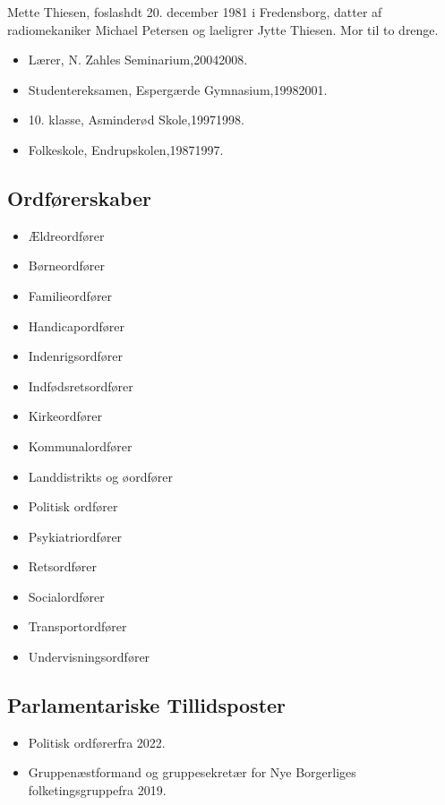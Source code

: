 \documentclass[11pt, a4paper]{awesome-cv}
\begin{document}
\makecvheader[R]
\makelettertitle
\begin{cvletter}
Mette Thiesen, foslashdt 20. december 1981 i Fredensborg, datter af radiomekaniker Michael Petersen og laeligrer Jytte Thiesen. Mor til to drenge.

\begin{itemize}
\item Lærer, N. Zahles Seminarium,20042008.
\item Studentereksamen, Espergærde Gymnasium,19982001.
\item 10. klasse, Asminderød Skole,19971998.
\item Folkeskole, Endrupskolen,19871997.
\end{itemize}
\subsection*{Ordførerskaber}
\begin{itemize}
\item Ældreordfører
\item Børneordfører
\item Familieordfører
\item Handicapordfører
\item Indenrigsordfører
\item Indfødsretsordfører
\item Kirkeordfører
\item Kommunalordfører
\item Landdistrikts og øordfører
\item Politisk ordfører
\item Psykiatriordfører
\item Retsordfører
\item Socialordfører
\item Transportordfører
\item Undervisningsordfører
\end{itemize}
\subsection*{Parlamentariske Tillidsposter}
\begin{itemize}
\item Politisk ordførerfra 2022.
\item Gruppenæstformand og gruppesekretær for Nye Borgerliges folketingsgruppefra 2019.
\end{itemize}

\end{cvletter}
\end{document}
